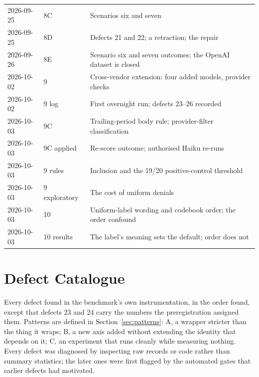 \documentclass[12pt,oneside]{report}
\begin{document}
\begin{longtable}{@{}llp{}@{}}
2026-09-25 & 8C & Scenarios six and seven \\
2026-09-25 & 8D & Defects 21 and 22; a retraction; the repair \\
2026-09-26 & 8E & Scenario six and seven outcomes; the OpenAI dataset is closed \\
2026-10-02 & 9 & Cross-vendor extension: four added models, provider checks \\
2026-10-02 & 9 log & First overnight run; defects 23--26 recorded \\
2026-10-03 & 9C & Trailing-period body rule; provider-filter classification \\
2026-10-03 & 9C applied & Re-score outcome; authorised Haiku re-runs \\
2026-10-03 & 9 rules & Inclusion and the 19/20 positive-control threshold \\
2026-10-03 & 9 exploratory & The cost of uniform denials \\
2026-10-03 & 10 & Uniform-label wording and codebook order; the order confound \\
2026-10-03 & 10 results & The label's meaning sets the default; order does not \\
\bottomrule
\end{longtable}

\chapter{Defect Catalogue}
\label{app:defects}

Every defect found in the benchmark's own instrumentation, in the order
found, except that defects 23 and 24 carry the numbers the preregistration
assigned them. Patterns are defined in Section~\ref{sec:patterns}: A, a wrapper
stricter than the thing it wraps; B, a new axis added without extending the
identity that depends on it; C, an experiment that runs cleanly while measuring
nothing. Every defect was diagnosed by inspecting raw records or code rather
than summary statistics; the later ones were first flagged by the automated
gates that earlier defects had motivated.
\end{document}
